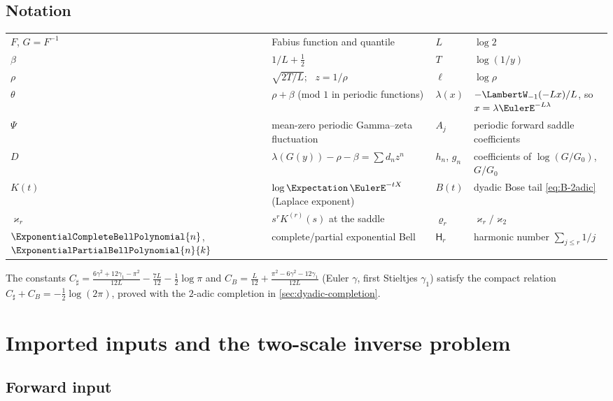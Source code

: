 \documentclass[11pt,oneside]{article}
\numberwithin{equation}{section}
\theoremstyle{definition}
\theoremstyle{remark}
\newcommand{\Csharp}{C_{\sharp}}
\newcommand{\CB}{C_{B}}
\newcommand{\Gzero}{G_0}
\newcommand{\Hnum}{\mathsf H}
\begin{document}
\subsection*{Notation}

\begin{center}
\small
\begin{tabular}{@{}llll@{}}
\toprule
$F$, $G=F^{-1}$ & Fabius function and quantile &
$L$ & $\log2$\\
$\beta$ & $1/L+\tfrac12$ &
$T$ & $\log(1/y)$\\
$\rho$ & $\sqrt{2T/L}$; \ $z=1/\rho$ &
$\ell$ & $\log\rho$\\
$\theta$ & $\rho+\beta$ (mod $1$ in periodic functions) &
$\lambda(x)$ & $-\LambertW_{-1}(-Lx)/L$, so $x=\lambda\EulerE^{-L\lambda}$\\
$\Psi$ & mean-zero periodic Gamma--zeta fluctuation &
$A_j$ & periodic forward saddle coefficients\\
$D$ & $\lambda(G(y))-\rho-\beta=\sum d_nz^{n}$ &
$h_n$, $g_n$ & coefficients of $\log(G/\Gzero)$, $G/\Gzero$\\
$K(t)$ & $\log\Expectation\,\EulerE^{-tX}$ (Laplace exponent) &
$B(t)$ & dyadic Bose tail \eqref{eq:B-2adic}\\
$\varkappa_r$ & $s^{r}K^{(r)}(s)$ at the saddle &
$\varrho_r$ & $\varkappa_r/\varkappa_2$\\
$\ExponentialCompleteBellPolynomial{n}$, $\ExponentialPartialBellPolynomial{n}{k}$ & complete/partial exponential Bell &
$\Hnum_r$ & harmonic number $\sum_{j\le r}1/j$\\
\bottomrule
\end{tabular}
\end{center}
The constants
$\Csharp=\frac{6\gamma^{2}+12\gamma_1-\pi^{2}}{12L}
-\frac{7L}{12}-\frac12\log\pi$ and
$\CB=\frac{L}{12}+\frac{\pi^{2}-6\gamma^{2}-12\gamma_1}{12L}$
(Euler $\gamma$, first Stieltjes $\gamma_1$) satisfy the compact
relation $\Csharp+\CB=-\tfrac12\log(2\pi)$, proved with the
$2$-adic completion in \cref{sec:dyadic-completion}.

\section{Imported inputs and the two-scale inverse problem}
\label{sec:inputs}

\subsection{Forward input}
\end{document}
